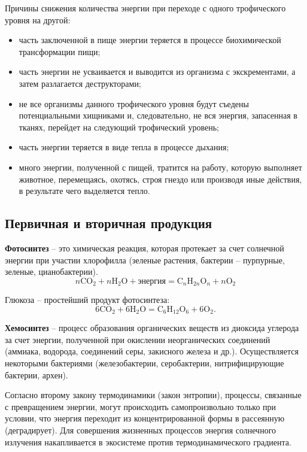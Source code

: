\documentclass[a5paper, 11pt]{extarticle}
\theoremstyle{definition}
\theoremstyle{definition}
\theoremstyle{definition}
\numberwithin{figure}{section}
\begin{document}
Причины снижения количества энергии при переходе с одного трофического уровня на другой:
\begin{itemize}
    \item часть заключенной в пище энергии теряется в процессе биохимической трансформации пищи;
    \item часть энергии не усваивается и выводится из организма с экскрементами, а затем разлагается деструкторами;
    \item не все организмы данного трофического уровня будут съедены потенциальными хищниками и, следовательно, не вся энергия, запасенная в тканях, перейдет на следующий трофический уровень;
    \item часть энергии теряется в виде тепла в процессе дыхания;
    \item много энергии, полученной с пищей, тратится на работу, которую выполняет животное, перемещаясь, охотясь, строя гнездо или производя иные действия, в результате чего выделяется тепло.
\end{itemize}

\subsection{Первичная и вторичная продукция}

\textbf{Фотосинтез} -- это химическая реакция, которая протекает за счет солнечной энергии при участии хлорофилла (зеленые растения, бактерии -- пурпурные, зеленые, цианобактерии).
\[
    n\text{CO}_2 + n\text{H}_2\text{O} + \text{энергия} = \text{C}_n\text{H}_{2n}\text{O}_n + n\text{O}_2
\]

Глюкоза -- простейший продукт фотосинтеза:
\[
    6\text{CO}_2 + 6\text{H}_2\text{O} = \text{C}_6\text{H}_{12}\text{O}_6 + 6\text{O}_2.
\]

\textbf{Хемосинтез} -- процесс образования органических веществ из диоксида углерода за счет энергии, полученной при окислении неорганических соединений (аммиака, водорода, соединений серы, закисного железа и др.). Осуществляется некоторыми бактериями (железобактерии, серобактерии, нитрифицирующие бактерии, архен).

Согласно второму закону термодинамики (закон энтропии), процессы, связанные с превращением энергии, могут происходить самопроизвольно только при условии, что энергия переходит из концентрированной формы в рассеянную (деградирует). Для совершения жизненных процессов энергия солнечного излучения накапливается в экосистеме против термодинамического градиента.
\end{document}
